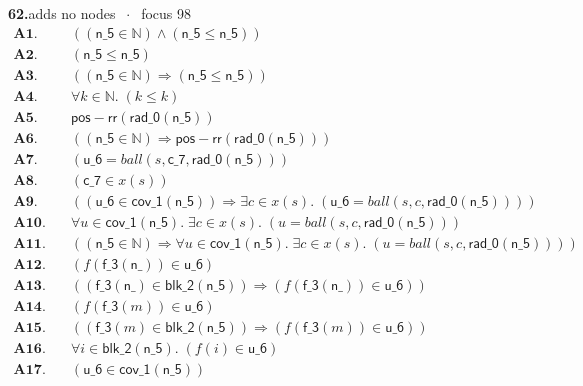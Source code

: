 \documentclass[11pt]{article}
\newcommand{\fit}[1]{\resizebox{\ifdim\width>\linewidth\linewidth\else\width\fi}{!}{#1}}
\begin{document}
\medskip\noindent\textbf{62.}\quad \fit{\texttt{(ass)}}\hfill{\small adds no nodes $\;\cdot\;$ focus 98}\\[2pt]
\begin{align*}
  \mathbf{A1.}\quad & ((\mathsf{n\_5} \in \mathbb{N}) \wedge (\mathsf{n\_5} \leq \mathsf{n\_5})) \\
  \mathbf{A2.}\quad & (\mathsf{n\_5} \leq \mathsf{n\_5}) \\
  \mathbf{A3.}\quad & ((\mathsf{n\_5} \in \mathbb{N}) \Rightarrow (\mathsf{n\_5} \leq \mathsf{n\_5})) \\
  \mathbf{A4.}\quad & \forall k \in \mathbb{N}.\; (k \leq k) \\
  \mathbf{A5.}\quad & \mathsf{pos{-}rr}(\mathsf{rad\_0}(\mathsf{n\_5})) \\
  \mathbf{A6.}\quad & ((\mathsf{n\_5} \in \mathbb{N}) \Rightarrow \mathsf{pos{-}rr}(\mathsf{rad\_0}(\mathsf{n\_5}))) \\
  \mathbf{A7.}\quad & (\mathsf{u\_6} = \mathit{ball}(s, \mathsf{c\_7}, \mathsf{rad\_0}(\mathsf{n\_5}))) \\
  \mathbf{A8.}\quad & (\mathsf{c\_7} \in x(s)) \\
  \mathbf{A9.}\quad & ((\mathsf{u\_6} \in \mathsf{cov\_1}(\mathsf{n\_5})) \Rightarrow \exists c \in x(s).\; (\mathsf{u\_6} = \mathit{ball}(s, c, \mathsf{rad\_0}(\mathsf{n\_5})))) \\
  \mathbf{A10.}\quad & \forall u \in \mathsf{cov\_1}(\mathsf{n\_5}).\; \exists c \in x(s).\; (u = \mathit{ball}(s, c, \mathsf{rad\_0}(\mathsf{n\_5}))) \\
  \mathbf{A11.}\quad & ((\mathsf{n\_5} \in \mathbb{N}) \Rightarrow \forall u \in \mathsf{cov\_1}(\mathsf{n\_5}).\; \exists c \in x(s).\; (u = \mathit{ball}(s, c, \mathsf{rad\_0}(\mathsf{n\_5})))) \\
  \mathbf{A12.}\quad & (f(\mathsf{f\_3}(\mathsf{n\_})) \in \mathsf{u\_6}) \\
  \mathbf{A13.}\quad & ((\mathsf{f\_3}(\mathsf{n\_}) \in \mathsf{blk\_2}(\mathsf{n\_5})) \Rightarrow (f(\mathsf{f\_3}(\mathsf{n\_})) \in \mathsf{u\_6})) \\
  \mathbf{A14.}\quad & (f(\mathsf{f\_3}(m)) \in \mathsf{u\_6}) \\
  \mathbf{A15.}\quad & ((\mathsf{f\_3}(m) \in \mathsf{blk\_2}(\mathsf{n\_5})) \Rightarrow (f(\mathsf{f\_3}(m)) \in \mathsf{u\_6})) \\
  \mathbf{A16.}\quad & \forall i \in \mathsf{blk\_2}(\mathsf{n\_5}).\; (f(i) \in \mathsf{u\_6}) \\
  \mathbf{A17.}\quad & (\mathsf{u\_6} \in \mathsf{cov\_1}(\mathsf{n\_5})) \\

\end{align*}
\end{document}
